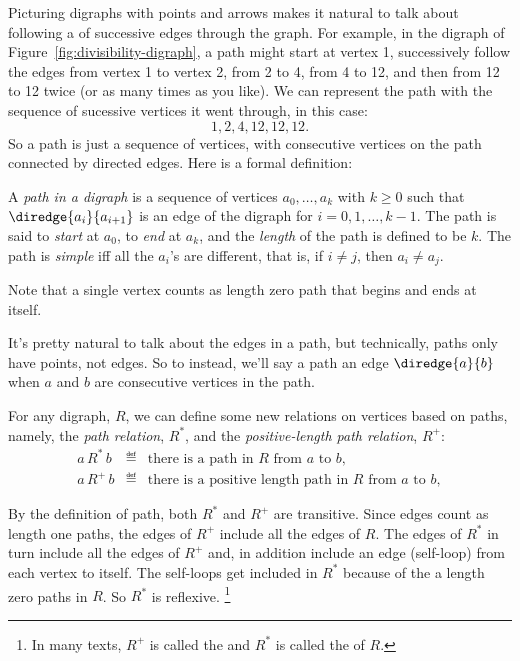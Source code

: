 Picturing digraphs with points and arrows makes it natural to talk
about following a  of successive edges through the graph.
For example, in the digraph of Figure~\ref{fig:divisibility-digraph},
a path might start at vertex 1, successively follow the edges from
vertex 1 to vertex 2, from 2 to 4, from 4 to 12, and then from 12 to
12 twice (or as many times as you like).  We can represent the path
with the sequence of sucessive vertices it went through, in this case:
\[
1,2,4,12,12,12.
\]
So a path is just a sequence of vertices, with consecutive vertices on
the path connected by directed edges.  Here is a formal
definition:

\begin{definition}\label{def:digraph-paths}
A \emph{path in a digraph} is a sequence of vertices $a_0,\dots,a_k$
with $k \ge 0$ such that $\diredge{a_i}{a_{i+1}}$ is an edge of the
digraph for $i = 0,1,\dots, k-1$.  The path is said to \emph{start} at
$a_0$, to \emph{end} at $a_k$, and the \emph{length} of the path is
defined to be $k$.  The path is \emph{simple} iff all the $a_i$'s are
different, that is, if $i \neq j$, then $a_i \neq a_j$.
\end{definition}
Note that a single vertex counts as length zero path that begins and
ends at itself.

It's pretty natural to talk about the edges in a path, but
technically, paths only have points, not edges.  So to instead, we'll
say a path  an edge $\diredge{a}{b}$ when $a$ and $b$
are consecutive vertices in the path.

For any digraph, $R$, we can define some new relations on vertices
based on paths, namely, the \emph{path relation}, $R^*$, and the
\emph{positive-length path relation}, $R^+$:
\begin{eqnarray*}
a\, R^*\, b &\eqdef& \mbox{there is a path in $R$ from $a$ to $b$},\\
a\, R^+\, b &\eqdef& \mbox{there is a positive length path in $R$ from $a$ to $b$},
\end{eqnarray*}

By the definition of path, both $R^*$ and $R^+$ are transitive.  Since
edges count as length one paths, the edges of $R^+$ include all the
edges of $R$.  The edges of $R^*$ in turn include all the edges of
$R^+$ and, in addition include an edge (self-loop) from each vertex to
itself.  The self-loops get included in $R^*$ because of the a length
zero paths in $R$.  So $R^*$ is reflexive.  \footnote{In many texts,
  $R^+$ is called the  and $R^*$ is called
  the  of $R$.}

